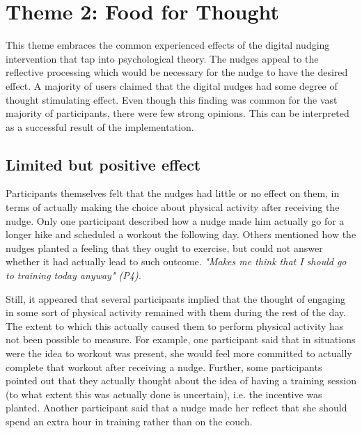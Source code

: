\section{Theme 2: Food for Thought }
This theme embraces the common experienced effects of the digital nudging intervention that tap into psychological theory. The nudges appeal to the reflective processing which would be necessary for the nudge to have the desired effect. A majority of users claimed that the digital nudges had some degree of thought stimulating effect. Even though this finding was common for the vast majority of participants, there were few strong opinions. This can be interpreted as a successful result of the implementation. 

\subsection{Limited but positive effect }
Participants themselves felt that the nudges had little or no effect on them, in terms of actually making the choice about physical activity after receiving the nudge. Only one participant described how a nudge made him actually go for a longer hike and scheduled a workout the following day. Others mentioned how the nudges planted a feeling that they ought to exercise, but could not answer whether it had actually lead to such outcome. \textit{"Makes me think that I should go to training today anyway" (P4).}

Still, it appeared that several participants implied that the thought of engaging in some sort of physical activity remained with them during the rest of the day. The extent to which this actually caused them to perform physical activity has not been possible to measure. For example, one participant said that in situations were the idea to workout was present, she would feel more committed to actually complete that workout after receiving a nudge. Further, some participants pointed out that they actually thought about the idea of having a training session (to what extent this was actually done is uncertain), i.e. the incentive was planted. Another participant said that a nudge made her reflect that she should spend an extra hour in training rather than on the couch. 

